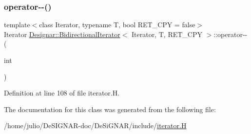 \subsubsection{\texorpdfstring{operator-\/-\/()}{operator--()}\hspace{0.1cm}{\footnotesize\ttfamily [2/2]}}
{\footnotesize\ttfamily template$<$class Iterator, typename T, bool R\+E\+T\+\_\+\+C\+PY = false$>$ \\
Iterator \hyperlink{class_designar_1_1_bidirectional_iterator}{Designar\+::\+Bidirectional\+Iterator}$<$ Iterator, T, R\+E\+T\+\_\+\+C\+PY $>$\+::operator-\/-\/ (\begin{DoxyParamCaption}\item[{int}]{ }\end{DoxyParamCaption})\hspace{0.3cm}{\ttfamily [inline]}}



Definition at line 108 of file iterator.\+H.



The documentation for this class was generated from the following file\+:\begin{DoxyCompactItemize}
\item 
/home/julio/\+De\+S\+I\+G\+N\+A\+R-\/doc/\+De\+Si\+G\+N\+A\+R/include/\hyperlink{iterator_8_h}{iterator.\+H}\end{DoxyCompactItemize}
